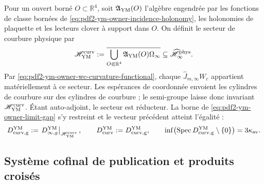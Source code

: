 Pour un ouvert borné $O\subset\mathbb R^4$, soit
$\mathfrak A_{\rm YM}(O)$ l’algèbre engendrée par les fonctions de classe bornées de
\eqref{eq:pdf2-ym-owner-incidence-holonomy}, les holonomies de plaquette et les lecteurs
clover à support dans $O$. On définit le secteur de courbure physique par
\begin{equation}\label{eq:pdf2-ym-owner-curvature-cyclic-sector}
 \mathscr H_{\rm YM}^{\rm curv}
 :=\overline{\bigcup_{O\Subset\mathbb R^4}
   \mathfrak A_{\rm YM}(O)\Omega_\infty}
 \subseteq\widehat{\mathscr H}_\infty^{\rm phys}.
\end{equation}
Par \eqref{eq:pdf2-ym-owner-wc-curvature-functional}, chaque
$\widehat J_{m,\infty}W_c$ appartient matériellement à ce secteur.
Les espérances de coordonnée envoient les cylindres de courbure sur des cylindres de
courbure ; le semi-groupe laisse donc invariant
$\mathscr H_{\rm YM}^{\rm curv}$. Étant auto-adjoint, le secteur est réducteur. La
borne de \eqref{eq:pdf2-ym-owner-limit-gap} s’y restreint et le vecteur précédent
atteint l’égalité :
\begin{equation}\label{eq:pdf2-ym-owner-curvature-sector-gap}
 D_{\rm curv,g}^{\rm YM}
 :=\left.D_{\infty,g}^{\rm YM}\right|_{\mathscr H_{\rm YM}^{\rm curv}},
 \qquad D_{\rm curv}^{\rm YM}:=D_{\rm curv,g}^{\rm YM},
 \qquad
 \inf\bigl(\operatorname{Spec}D_{\rm curv,g}^{\rm YM}\setminus\{0\}\bigr)
 =3\kappa_{\rm av}.
\end{equation}

\subsection{Système cofinal de publication et produits croisés}

